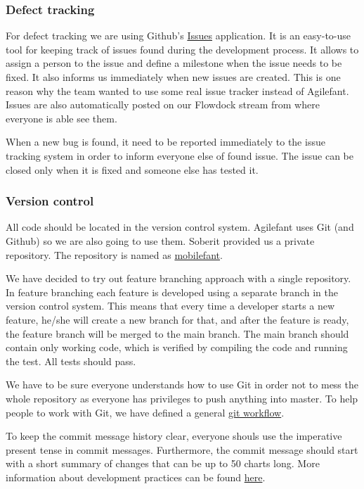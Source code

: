\subsubsection{Defect tracking}

For defect tracking we are using Github's
\href{https://github.com/soberit/mobilefant/issues}{Issues} application. It is
an easy-to-use tool for keeping track of issues found during the development
process. It allows to assign a person to the issue and define a milestone when
the issue needs to be fixed. It also informs us immediately when new issues are
created. This is one reason why the team wanted to use some real issue tracker
instead of Agilefant. Issues are also automatically posted on our Flowdock
stream from where everyone is able see them.

When a new bug is found, it need to be reported immediately to the issue
tracking system in order to inform everyone else of found issue. The issue can
be closed only when it is fixed and someone else has tested it.

\subsubsection{Version control}

All code should be located in the version control system. Agilefant uses Git
(and Github) so we are also going to use them. Soberit provided us a private
repository. The repository is named as
\href{https://github.com/soberit/mobilefant}{mobilefant}.

We have decided to try out feature branching approach with a single repository.
In feature branching each feature is developed using a separate branch in the
version control system. This means that every time a developer starts a new
feature, he/she will create a new branch for that, and after the feature is
ready, the feature branch will be merged to the main branch. The main branch
should contain only working code, which is verified by compiling the code and
running the test. All tests should pass.

We have to be sure everyone understands how to use Git in order not to mess
the whole repository as everyone has privileges to push anything into master. To
help people to work with Git, we have defined a general
\href{https://docs.google.com/document/d/1wAih0JzkrZ4ySUZ_MO-F8MvGkPXKHicYbG1972Sxo2w/edit?usp=sharing}{git
workflow}. 

To keep the commit message history clear, everyone shouls use the imperative
present tense in commit messages. Furthermore, the commit message should start
with a short summary of changes that can be up to 50 charts long. More
information about development practices can be found
\href{https://docs.google.com/document/d/1Advu6FXwe2axjmO29-fMpw7hbDMeZwJzMF5ad391aBE/edit?usp=sharing}{here}.

